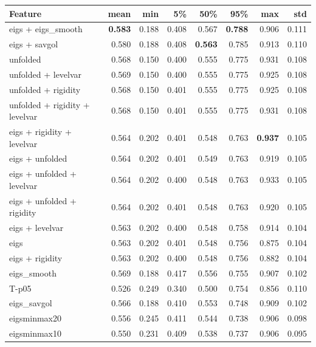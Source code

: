 \documentclass[12pt]{spieman}  %
\begin{document}
\begin{spacing}{2}
\begin{table}[h!]
\begin{tabular}{lrrrrrrr}
\hline
Feature &      mean &       min &        5\% &       50\% &       95\% &       max &       std \\
\hline
eigs + eigs\_smooth            &  \textbf{0.583} &  0.188 &  0.408 &  0.567 &  \textbf{0.788} &  0.906 &  0.111 \\
eigs + savgol                  &  0.580 &  0.188 &  0.408 &  \textbf{0.563} &  0.785 &  0.913 &  0.110 \\
unfolded                       &  0.568 &  0.150 &  0.400 &  0.555 &  0.775 &  0.931 &  0.108 \\
unfolded + levelvar            &  0.569 &  0.150 &  0.400 &  0.555 &  0.775 &  0.925 &  0.108 \\
unfolded + rigidity            &  0.568 &  0.150 &  0.401 &  0.555 &  0.775 &  0.925 &  0.108 \\
unfolded + rigidity + levelvar &  0.568 &  0.150 &  0.401 &  0.555 &  0.775 &  0.931 &  0.108 \\
eigs + rigidity + levelvar     &  0.564 &  0.202 &  0.401 &  0.548 &  0.763 &  \textbf{0.937} &  0.105 \\
eigs + unfolded                &  0.564 &  0.202 &  0.401 &  0.549 &  0.763 &  0.919 &  0.105 \\
eigs + unfolded + levelvar     &  0.564 &  0.202 &  0.400 &  0.548 &  0.763 &  0.933 &  0.105 \\
eigs + unfolded + rigidity     &  0.564 &  0.202 &  0.401 &  0.548 &  0.763 &  0.920 &  0.105 \\
eigs + levelvar                &  0.563 &  0.202 &  0.400 &  0.548 &  0.758 &  0.914 &  0.104 \\
eigs                           &  0.563 &  0.202 &  0.401 &  0.548 &  0.756 &  0.875 &  0.104 \\
eigs + rigidity                &  0.563 &  0.202 &  0.400 &  0.548 &  0.756 &  0.882 &  0.104 \\
eigs\_smooth                   &  0.569 &  0.188 &  0.417 &  0.556 &  0.755 &  0.907 &  0.102 \\
T-p05                          &  0.526 &  0.249 &  0.340 &  0.500 &  0.754 &  0.856 &  0.110 \\
eigs\_savgol                   &  0.566 &  0.188 &  0.410 &  0.553 &  0.748 &  0.909 &  0.102 \\
eigsminmax20                   &  0.556 &  0.245 &  0.411 &  0.544 &  0.738 &  0.906 &  0.098 \\
eigsminmax10                   &  0.550 &  0.231 &  0.409 &  0.538 &  0.737 &  0.906 &  0.095 \\

\end{tabular}
\end{table}
\end{spacing}
\end{document}
